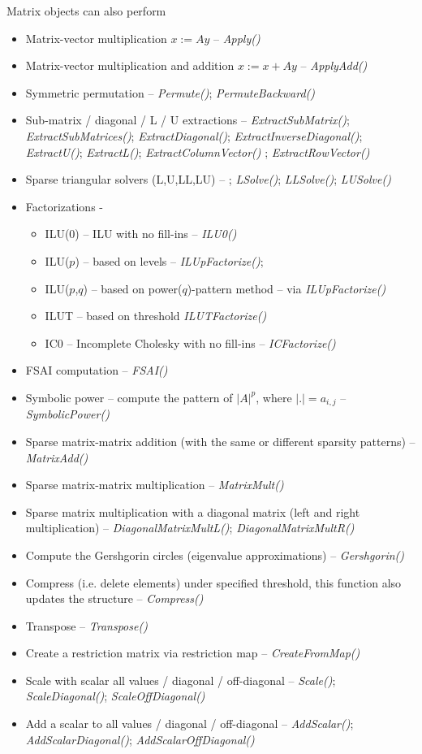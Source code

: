 \vspace{6mm}
Matrix objects can also perform 
\begin{itemize}
\itemsep0em
\item Matrix-vector multiplication $x:=Ay$ -- \emph{Apply()} 
\item Matrix-vector multiplication and addition $x:=x+Ay$ -- \emph{ApplyAdd()}
\item Symmetric permutation -- \emph{Permute()}; \emph{PermuteBackward()}
\item Sub-matrix / diagonal / L / U extractions -- \emph{ExtractSubMatrix()}; \emph{ExtractSubMatrices()}; \emph{ExtractDiagonal()}; \emph{ExtractInverseDiagonal()}; \emph{ExtractU()}; \emph{ExtractL()}; \emph{ExtractColumnVector()} ; \emph{ExtractRowVector()}
\item Sparse triangular solvers (L,U,LL,LU) -- ; \emph{LSolve()}; \emph{LLSolve()}; \emph{LUSolve()}
\item Factorizations - 
\begin{itemize}
 \item ILU(0) -- ILU with no fill-ins -- \emph{ILU0()}
 \item ILU($p$) -- based on levels -- \emph{ILUpFactorize()};
 \item ILU($p$,$q$) -- based on power($q$)-pattern method -- via \emph{ILUpFactorize()}
 \item ILUT -- based on threshold \emph{ILUTFactorize()}
 \item IC0 -- Incomplete Cholesky with no fill-ins -- \emph{ICFactorize()}
\end{itemize}
\item FSAI computation -- \emph{FSAI()}
\item Symbolic power -- compute the pattern of $|A|^p$, where $|.|=a_{i,j}$ -- \emph{SymbolicPower()}
\item Sparse matrix-matrix addition (with the same or different sparsity patterns) -- \emph{MatrixAdd()}
\item Sparse matrix-matrix multiplication -- \emph{MatrixMult()}
\item Sparse matrix multiplication with a diagonal matrix (left and right multiplication) -- \emph{DiagonalMatrixMultL()}; \emph{DiagonalMatrixMultR()}
\item Compute the Gershgorin circles (eigenvalue approximations) -- \emph{Gershgorin()}
\item Compress (i.e. delete elements) under specified threshold, this function also updates the structure -- \emph{Compress()}
\item Transpose -- \emph{Transpose()}
\item Create a restriction matrix via restriction map -- \emph{CreateFromMap()}
\item Scale with scalar all values / diagonal / off-diagonal -- \emph{Scale()}; \emph{ScaleDiagonal()}; \emph{ScaleOffDiagonal()}
\item Add a scalar to all values / diagonal / off-diagonal -- \emph{AddScalar()}; \emph{AddScalarDiagonal()}; \emph{AddScalarOffDiagonal()}
\end{itemize}

